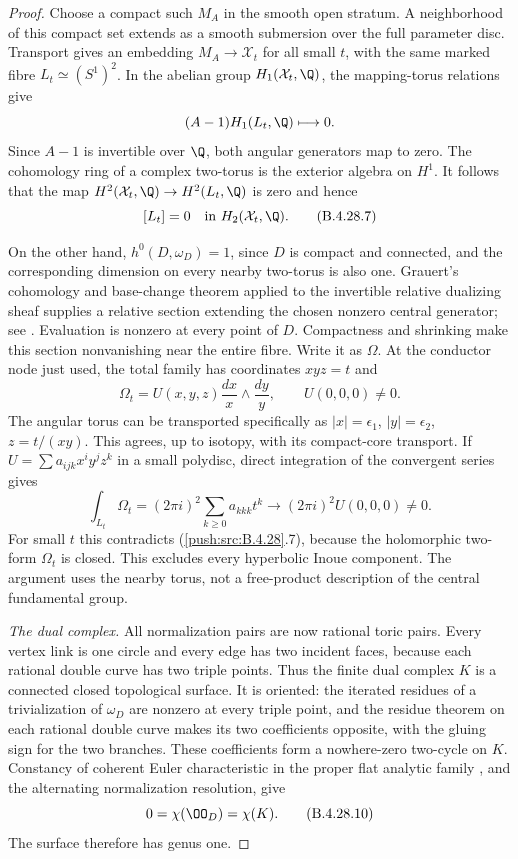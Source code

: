 \begin{proof}
Choose a compact such $M_A$ in the smooth open stratum.
A neighborhood of this compact set extends as a
smooth submersion over the full parameter disc.
Transport gives an embedding $M_A\to\mathcal X_t$ for
all small $t$, with the same marked fibre $L_t\simeq
(S^1)^2$. In the abelian group
$H_1(\mathcal X_t,\Q)$, the mapping-torus relations give
\[
 (A-1)H_1(L_t,\Q)\longmapsto0.
\]
Since $A-1$ is invertible over $\Q$, both angular
generators map to zero. The cohomology ring of a
complex two-torus is the exterior algebra on $H^1$.
It follows that the map $H^2(\mathcal X_t,\Q)\to
H^2(L_t,\Q)$ is zero and hence
\[
 [L_t]=0\quad\hbox{in }H_2(\mathcal X_t,\Q).           \tag{B.4.28.7}
\]

On the other hand, $h^0(D,\omega_D)=1$, since $D$ is
compact and connected, and the corresponding dimension
on every nearby two-torus is also one. Grauert's
cohomology and base-change theorem applied to the
invertible relative dualizing sheaf supplies a relative
section extending the chosen nonzero central generator;
see \citet[Chapter III, Theorem 4.12(ii)]{BS76}.
Evaluation is
nonzero at every point of $D$. Compactness and shrinking
make this section nonvanishing near the entire fibre.
Write it as $\Omega$. At the conductor node just used,
the total family has coordinates $xyz=t$ and
\[
 \Omega_t=U(x,y,z)\frac{dx}{x}\wedge\frac{dy}{y},
 \qquad U(0,0,0)\ne0.                                \tag{B.4.28.8}
\]
The angular torus can be transported specifically as
$|x|=\epsilon_1$, $|y|=\epsilon_2$, $z=t/(xy)$.
This agrees, up to isotopy, with its compact-core
transport. If $U=\sum a_{ijk}x^iy^jz^k$ in a small
polydisc, direct integration of the convergent series
gives
\[
 \int_{L_t}\Omega_t
   =(2\pi i)^2\sum_{k\ge0}a_{kkk}t^k
   \longrightarrow(2\pi i)^2U(0,0,0)\ne0.            \tag{B.4.28.9}
\]
For small $t$ this contradicts (\ref{push:src:B.4.28}.7), because
the holomorphic two-form $\Omega_t$ is closed. This
excludes every hyperbolic Inoue component. The
argument uses the nearby torus, not a free-product
description of the central fundamental group.

\emph{The dual complex.}
All normalization pairs are now rational toric pairs.
Every vertex link is one circle and every edge has
two incident faces, because each rational double
curve has two triple points. Thus the finite dual
complex $K$ is a connected closed topological surface.
It is oriented: the iterated residues of a
trivialization of $\omega_D$ are nonzero at every
triple point, and the residue theorem on each rational
double curve makes its two coefficients opposite,
with the gluing sign for the two branches. These
coefficients form a nowhere-zero two-cycle on $K$.
Constancy of coherent Euler characteristic in the
proper flat analytic family
\citep[Chapter III, Theorem 4.12(iii)]{BS76}, and the alternating
normalization resolution, give
\[
 0=\chi(\OO_D)=\chi(K).                              \tag{B.4.28.10}
\]
The surface therefore has genus one.


\end{proof}
